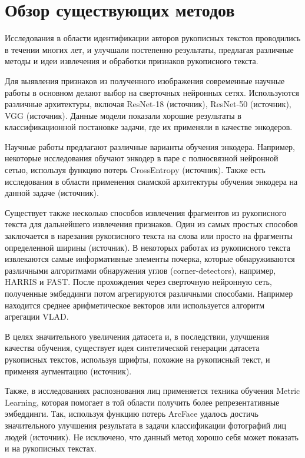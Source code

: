 \section{Обзор существующих методов}
    Исследования в области идентификации авторов рукописных текстов проводились в течении многих лет, и улучшали постепенно результаты, предлагая различные методы и идеи извлечения и обработки признаков рукописного текста. 
    
    Для выявления признаков из полученного изображения современные научные работы в основном делают выбор на сверточных нейронных сетях. Используются различные архитектуры, включая ResNet-18 (источник), ResNet-50 (источник), VGG (источник). Данные модели показали хорошие результаты в классификационной постановке задачи, где их применяли в качестве энкодеров.

    Научные работы предлагают различные варианты обучения энкодера. Например, некоторые исследования обучают энкодер в паре с полносвязной нейронной сетью, используя функцию потерь CrossEntropy (источник). Также есть исследования в области применения сиамской архитектуры обучения энкодера на данной задаче (источник).  

    Существует также несколько способов извлечения фрагментов из рукописного текста для дальнейшего извлечения признаков. Один из самых простых способов заключается в нарезания рукописного текста на слова или просто на фрагменты определенной ширины (источник). В некоторых работах из рукописного текста извлекаются самые информативные элементы почерка, которые обнаруживаются различными алгоритмами обнаружения углов (corner-detectors), например, HARRIS и FAST. После прохождения через сверточную нейронную сеть, полученные эмбеддинги потом агрегируются различными способами. Например находится среднее арифметическое векторов или используется алгоритм агрегации VLAD. 

    В целях значительного увеличения датасета и, в последствии, улучшения качества обучения, существует идея синтетической генерации датасета рукописных текстов, используя шрифты, похожие на рукописный текст, и применяя аугментацию (источник). 

    Также, в исследованиях распознования лиц применяется техника обучения Metric Learning, которая помогает в той области получить более репрезентативные эмбеддинги. Так, используя функцию потерь ArcFace удалось достичь значительного улучшения результата в задачи классификации фотографий лиц людей (источник). Не исключено, что данный метод хорошо себя может показать и на рукописных текстах.
    
